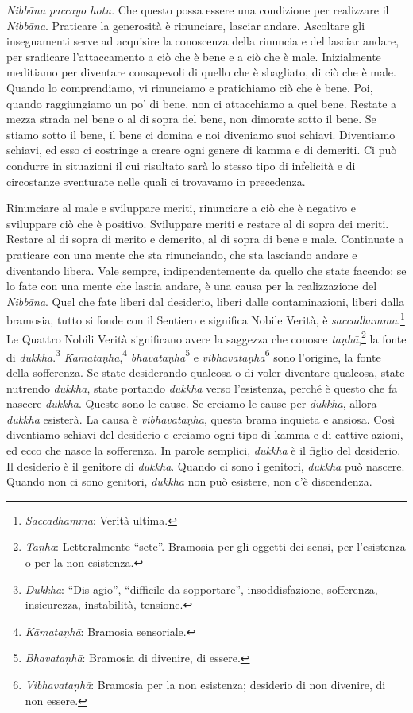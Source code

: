 \emph{Nibbāna paccayo hotu.} Che questo possa essere una condizione per
realizzare il \emph{Nibbāna}. Praticare la generosità è rinunciare,
lasciar andare. Ascoltare gli insegnamenti serve ad acquisire la
conoscenza della rinuncia e del lasciar andare, per sradicare
l'attaccamento a ciò che è bene e a ciò che è male. Inizialmente
meditiamo per diventare consapevoli di quello che è sbagliato, di ciò
che è male. Quando lo comprendiamo, vi rinunciamo e pratichiamo ciò che
è bene. Poi, quando raggiungiamo un po' di bene, non ci attacchiamo a
quel bene. Restate a mezza strada nel bene o al di sopra del bene, non
dimorate sotto il bene. Se stiamo sotto il bene, il bene ci domina e noi
diveniamo suoi schiavi. Diventiamo schiavi, ed esso ci costringe a
creare ogni genere di kamma e di demeriti. Ci può condurre in
situazioni il cui risultato sarà lo stesso tipo di infelicità e di
circostanze sventurate nelle quali ci trovavamo in precedenza.

Rinunciare al male e sviluppare meriti, rinunciare a ciò che è negativo
e sviluppare ciò che è positivo. Sviluppare meriti e restare al di sopra
dei meriti. Restare al di sopra di merito e demerito, al di sopra di
bene e male. Continuate a praticare con una mente che sta rinunciando,
che sta lasciando andare e diventando libera. Vale sempre,
indipendentemente da quello che state facendo: se lo fate con una mente
che lascia andare, è una causa per la realizzazione del \emph{Nibbāna}.
Quel che fate liberi dal desiderio, liberi dalle contaminazioni, liberi
dalla bramosia, tutto si fonde con il Sentiero e significa Nobile
Verità, è \emph{saccadhamma}.\footnote{\emph{Saccadhamma}: Verità
  ultima.} Le Quattro Nobili Verità significano avere la saggezza che
conosce \emph{taṇhā},\footnote{\emph{Taṇhā}: Letteralmente ``sete''.
  Bramosia per gli oggetti dei sensi, per l'esistenza o per la non
  esistenza.} la fonte di \emph{dukkha}.\footnote{\emph{Dukkha}:
  ``Dis-agio'', ``difficile da sopportare'', insoddisfazione,
  sofferenza, insicurezza, instabilità, tensione.}
\emph{Kāmataṇhā},\footnote{\emph{Kāmataṇhā}: Bramosia sensoriale.}
\emph{bhavataṇhā}\footnote{\emph{Bhavataṇhā}: Bramosia di divenire, di
  essere.} e \emph{vibhavataṇhā}\footnote{\emph{Vibhavataṇhā}: Bramosia
  per la non esistenza; desiderio di non divenire, di non essere.} sono
l'origine, la fonte della sofferenza. Se state desiderando qualcosa o di
voler diventare qualcosa, state nutrendo \emph{dukkha}, state portando
\emph{dukkha} verso l'esistenza, perché è questo che fa nascere
\emph{dukkha}. Queste sono le cause. Se creiamo le cause per
\emph{dukkha}, allora \emph{dukkha} esisterà. La causa è
\emph{vibhavataṇhā}, questa brama inquieta e ansiosa. Così diventiamo
schiavi del desiderio e creiamo ogni tipo di kamma e di cattive
azioni, ed ecco che nasce la sofferenza. In parole semplici,
\emph{dukkha} è il figlio del desiderio. Il desiderio è il genitore di
\emph{dukkha}. Quando ci sono i genitori, \emph{dukkha} può nascere.
Quando non ci sono genitori, \emph{dukkha} non può esistere, non c'è
discendenza.


